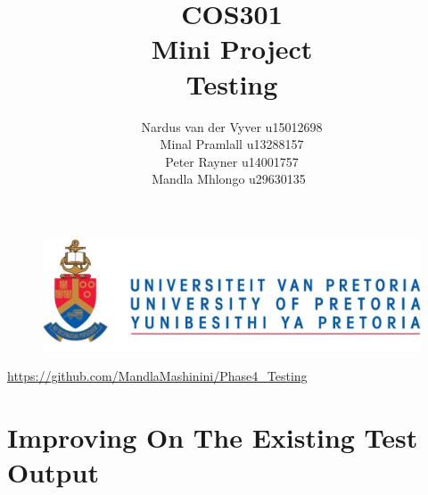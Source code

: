 \documentclass[12pt]{article}
\begin{document}
	

	\begin{figure}
		\includegraphics[width=\linewidth]{logo.jpg}	
	\end{figure}

	\title 	{
				COS301\\
				Mini Project\\
				Testing
		   	}
	\author {
				Nardus van der Vyver u15012698\\
				Minal Pramlall u13288157\\
				Peter Rayner u14001757\\
				Mandla Mhlongo u29630135\
			}
	\maketitle
	\begin{center}
			\url{https://github.com/MandlaMashinini/Phase4_Testing}	
	\end{center}
	\newpage
	\tableofcontents
	\newpage
	\section{Improving On The Existing Test Output}
\end{document}
